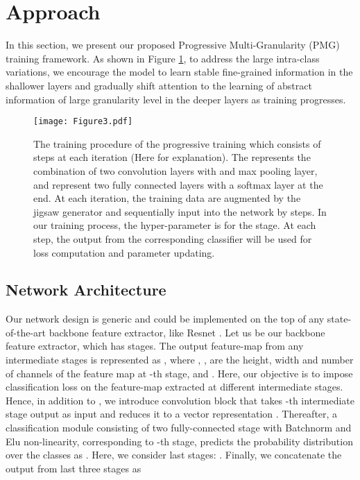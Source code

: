\documentclass{llncs}
\begin{document}
\section{Approach}

In this section, we present our proposed Progressive Multi-Granularity (PMG) training framework. As shown in Figure \ref{fig:network_train}, to address the large intra-class variations, we encourage the model to learn stable fine-grained information in the shallower layers and gradually shift attention to the learning of abstract information of large granularity level in the deeper layers as training progresses. 












\begin{figure}[!t]
\centering
\texttt{[image: Figure3.pdf]}
\caption{
The training procedure of the progressive training which consists of  steps at each iteration (Here  for explanation). The   represents the combination of two convolution layers with and max pooling layer, and  represent two fully connected layers with a softmax layer at the end. At each iteration, the training data are augmented by the jigsaw generator and sequentially input into the network by  steps. In our training process, the hyper-parameter  is  for the  stage. At each step, the output from the corresponding classifier will be used for loss computation and parameter updating.
}
\label{fig:network_train}
\end{figure}

\subsection{Network Architecture}

Our network design is generic and could be implemented on the top of any state-of-the-art backbone feature extractor, like Resnet \cite{he2016deep}. Let us  be our backbone feature extractor, which has  stages. The output feature-map from any intermediate stages is represented as , where , ,  are the height, width and number of channels of the feature map at -th stage, and . Here, our objective is to impose classification loss on the feature-map extracted at different intermediate stages. Hence, in addition to , we introduce convolution block  that takes -th intermediate stage output  as input and reduces it to a vector representation . Thereafter, a classification module  consisting of two fully-connected stage with Batchnorm \cite{ioffe2015batch} and Elu\cite{clevert2015fast} non-linearity, corresponding to -th stage, predicts the probability distribution over the classes as . Here, we consider last  stages: . Finally, we concatenate the output from last three stages as 
\end{document}
